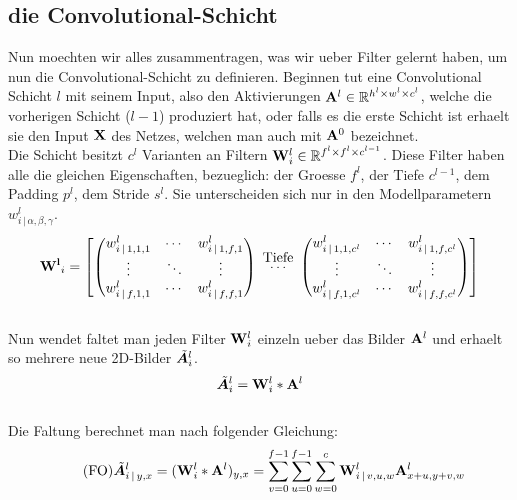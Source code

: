 \subsection{die Convolutional-Schicht}
Nun moechten wir alles zusammentragen, was wir ueber Filter gelernt
haben, um nun die Convolutional-Schicht zu definieren.
\para{}
Beginnen tut eine Convolutional Schicht $l$ mit seinem Input, also den
Aktivierungen $\mathbf{A}^l \in \mathbb{R}^{h^l \times w^l \times c^l}$, welche die vorherigen Schicht ($l-1$) produziert hat,
oder falls es die erste Schicht ist erhaelt sie den Input $\mathbf{X}$ des Netzes,
welchen man auch mit $\mathbf{A}^0$ bezeichnet. \\
Die Schicht besitzt $c^l$ Varianten an Filtern $\mathbf{W}^l_i \in
\mathbb{R}^{f^l \times f^l \times c^{l-1}}$. Diese Filter haben alle die gleichen
Eigenschaften, bezueglich: der Groesse $f^l$, der Tiefe $c^{l-1}$, dem Padding
$p^l$, dem Stride $s^l$. Sie unterscheiden sich nur in den Modellparametern
$w^l_{i\,|\,\alpha,\beta,\gamma}$.
\\
\begin{equation*}
  \ten{W^l}_i =
  \begin{bmatrix}
    \begin{pmatrix}
      w_{i\,|\,1,1,1}^l & \cdots & w_{i\,|\,1,f,1}^l \\
      \vdots & \ddots & \vdots \\
      w_{i\,|\,f,1,1}^l & \cdots & w_{i\,|\,f,f,1}^l
    \end{pmatrix}
    & \stackrel{\mathclap{\normalfont\mbox{Tiefe}}}{\cdots} &
    \begin{pmatrix}
      w_{i\,|\,1,1,c^l}^l & \cdots & w_{i\,|\,1,f,c^l}^l \\
      \vdots & \ddots & \vdots \\
      w_{i\,|\,f,1,c^l}^l & \cdots & w_{i\,|\,f,f,c^l}^l
    \end{pmatrix}
  \end{bmatrix}
\end{equation*}
\\
Nun wendet faltet man jeden Filter $\mathbf{W}_i^l$ einzeln ueber das Bilder
$\mathbf{A}^l$ und erhaelt so mehrere neue 2D-Bilder $\tilde{\bm{A}}_i^l$.
\\
\begin{equation}
  \tilde{\bm{A}}_i^l = \mathbf{W}_i^l * \mathbf{A}^l
\end{equation}
\\
Die Faltung berechnet man nach folgender Gleichung:
\\
\begin{equation}\tag{FO}
  \tilde{\bm{A}}_{i\,|\,y,x}^l = (\mathbf{W}_i^l * \mathbf{A}^l)_{y,x} = \sum_{v=0}^{f-1} \sum_{u=0}^{f-1} \sum_{w=0}^c \mathbf{W}^l_{i\,|\,v,u,w} \mathbf{A}^l_{x+u,y+v,w}
\end{equation}
